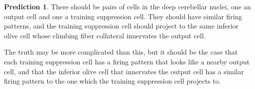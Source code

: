 \documentclass{article}
\theoremstyle{definition}
\newtheorem{pred}[thm]{Prediction}
\begin{document}
\begin{pred}
There should be pairs of cells in the deep cerebellar nuclei, one an
output cell and one a training suppression cell. They should have
similar firing patterns, and the training suppression cell should
project to the same inferior olive cell whose climbing fiber
collateral innervates the output cell.

The truth may be more complicated than this, but it should be the case
that each training suppression cell has a firing pattern that looks
like a nearby output cell, and that the inferior olive cell that
innervates the output cell has a similar firing pattern to the one
which the training suppression cell projects to.
\end{pred}
\end{document}
